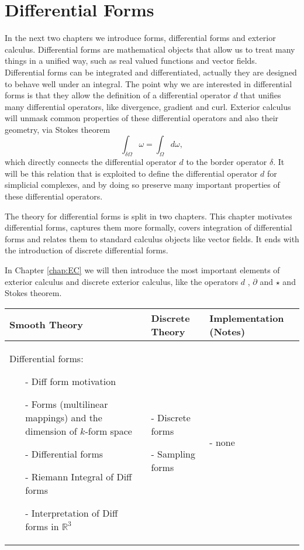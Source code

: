 \chapter{Differential Forms}
In the next two chapters we introduce forms, differential forms and exterior calculus. Differential forms are mathematical objects that allow us to treat many things in a unified way, such as real valued functions and vector fields. Differential forms can be integrated and differentiated, actually they are designed to behave well under an integral. The point why we are interested in differential forms is that they allow the definition of a differential operator $d$ that unifies many differential operators, like divergence, gradient and curl. Exterior calculus will unmask common properties of these differential operators and also their geometry, via Stokes theorem
\[\int_{\delta \Omega} \omega = \int_{\Omega} d\omega,\]
which directly connects the differential operator $d$ to the border operator $\delta$. It will be this relation that is exploited to define the differential operator $d$ for simplicial complexes, and by doing so preserve many important properties of these differential operators.

The theory for differential forms is split in two chapters. This chapter motivates differential forms, captures them more formally, covers integration of differential forms and relates them to standard calculus objects like vector fields. It ends with the introduction of discrete differential forms.

In Chapter \ref{chap:EC} we will then introduce the most important elements of exterior calculus and discrete exterior calculus, like the operators $d$ , $\partial$ and $\star$ and Stokes theorem. 
\begin{table}[h]
	\begin{longtable}{|p{4.5cm}|p{4.5cm}|p{4.5cm}|}
		\hline
		Smooth Theory& Discrete Theory& Implementation (Notes)\\
		\hline
			Differential forms: \begin{itemize}
			  \setlength{\itemsep}{1pt}
			  \setlength{\parskip}{0pt}
				\setlength{\parsep}{0pt}
				\item[-]Diff form motivation
				\item[-]Forms (multilinear mappings) and the dimension of $k$-form space 
				\item[-]Differential forms 
				\item[-]Riemann Integral of Diff forms 
				\item[-]Interpretation of Diff forms in $\mathbb R^3$ 
			\end{itemize}
			&
			\begin{packed_enum}
				\item[-] Discrete forms
				\item[-] Sampling forms
			\end{packed_enum}
			 & - none
			 \\		
		\hline
	\end{longtable}
	\end{table}
	

